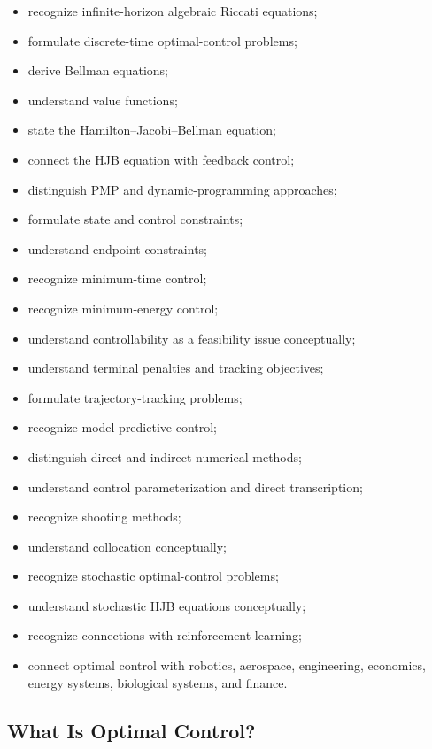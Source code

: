 {\begin{itemize}
    \item recognize infinite-horizon algebraic Riccati equations;
    \item formulate discrete-time optimal-control problems;
    \item derive Bellman equations;
    \item understand value functions;
    \item state the Hamilton--Jacobi--Bellman equation;
    \item connect the HJB equation with feedback control;
    \item distinguish PMP and dynamic-programming approaches;
    \item formulate state and control constraints;
    \item understand endpoint constraints;
    \item recognize minimum-time control;
    \item recognize minimum-energy control;
    \item understand controllability as a feasibility issue conceptually;
    \item understand terminal penalties and tracking objectives;
    \item formulate trajectory-tracking problems;
    \item recognize model predictive control;
    \item distinguish direct and indirect numerical methods;
    \item understand control parameterization and direct transcription;
    \item recognize shooting methods;
    \item understand collocation conceptually;
    \item recognize stochastic optimal-control problems;
    \item understand stochastic HJB equations conceptually;
    \item recognize connections with reinforcement learning;
    \item connect optimal control with robotics, aerospace, engineering,
          economics, energy systems, biological systems, and finance.
\end{itemize}
}

\subsection{What Is Optimal Control?}
\label{subsec:what-is-optimal-control}

